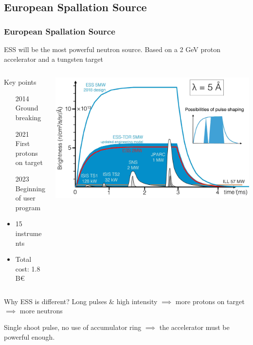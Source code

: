 \subsection{European Spallation Source}
\begin{frame}[t]
  \frametitle{European Spallation Source}
  ESS will be the most powerful neutron source.
  Based on a 2 GeV proton accelerator and a tungsten target
  \begin{columns}
    \begin{column}{0.35\textwidth}
      \begin{block}{Key points}
        \begin{itemize}
          \item[2014] Ground breaking
          \item[2021] First protons on target
          \item[2023] Beginning of user program
          \item 15 instruments
          \item Total cost: 1.8 B€
        \end{itemize}
      \end{block}
    \end{column}
    \begin{column}{0.60\textwidth}
      \includegraphics[width=\textwidth]{01_Neutron/fig/fig000_ESS_pulse2.jpeg}
    \end{column}
  \end{columns}
  \begin{block}{Why ESS is different?}
    Long pulses \& high intensity $\implies$ more protons on target $\implies$ more neutrons

    Single shoot pulse, no use of accumulator ring $\implies$ the accelerator must be powerful enough.
  \end{block}
\end{frame}

